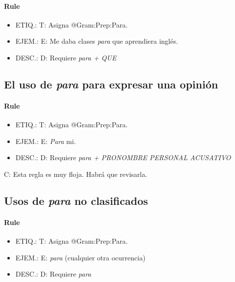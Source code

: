 \documentclass[11pt]{report}
\begin{document}
\paragraph*{Rule}
\begin{itemize}
\item ETIQ.:  T: Asigna @Gram:Prep:Para.
\item EJEM.:  E: Me daba clases \emph{para} que aprendiera inglés.
\item DESC.:  D: Requiere \emph{para + QUE}
\end{itemize}

\subsection{El uso de \emph{para} para expresar una opinión}
\paragraph*{Rule}
\begin{itemize}
\item ETIQ.:  T: Asigna @Gram:Prep:Para.
\item EJEM.:  E: \emph{Para} mi.
\item DESC.:  D: Requiere \emph{para + PRONOMBRE PERSONAL ACUSATIVO}
\end{itemize}

 C: Esta regla es muy floja. Habrá que revisarla.
\subsection{Usos de \emph{para} no clasificados}
\paragraph*{Rule}
\begin{itemize}
\item ETIQ.:  T: Asigna @Gram:Prep:Para.
\item EJEM.:  E: \emph{para} (cualquier otra ocurrencia)
\item DESC.:  D: Requiere \emph{para}
\end{itemize}
\end{document}
